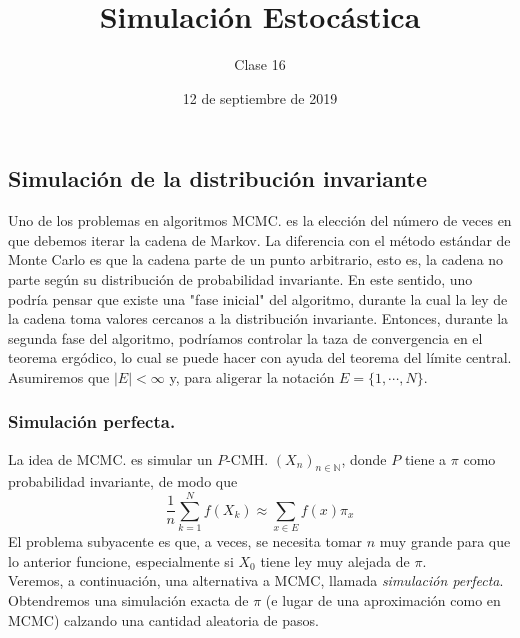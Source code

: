 \documentclass[a4paper]{article}
\title{Simulación Estocástica}
\author{Clase 16}
\date{12 de septiembre de 2019}
\numberwithin{equation}{subsection}
\numberwithin{definicion}{subsection}
\def\N{\mathbb N}
\begin{document}
\maketitle

\subsection{Simulación de la distribución invariante}
Uno de los problemas en algoritmos MCMC. es la elección del número de veces en que debemos iterar la cadena de Markov. La diferencia con el método estándar de Monte Carlo es que la cadena parte de un punto arbitrario, esto es, la cadena no parte según su distribución de probabilidad invariante. En este sentido, uno podría pensar que existe una "fase inicial" del algoritmo, durante la cual la ley de la cadena toma valores cercanos a la distribución invariante. Entonces, durante la segunda fase del algoritmo, podríamos controlar la taza de convergencia en el teorema ergódico, lo cual se puede hacer con ayuda del teorema del límite central. \\ Asumiremos que $|E| < \infty$ y, para aligerar la notación $E=\{1,\cdots,N\}$.

\subsubsection{Simulación perfecta.}
La idea de MCMC. es simular  un $P$-CMH. $(X_n)_{n\in\N}$, donde  $P$ tiene a $\pi$ como probabilidad invariante, de modo que
\[\frac{1}{n}\sum_{k=1}^Nf(X_k) \approx \sum_{x\in E}f(x)\pi_x\]
El problema subyacente es que, a veces, se necesita tomar $n$ muy grande  para que lo anterior funcione, especialmente si $X_0$ tiene ley muy alejada de $\pi$.\\ \newline
Veremos, a continuación, una alternativa a MCMC, llamada \textit{simulación perfecta}. Obtendremos una simulación exacta de $\pi$ (e lugar de una aproximación como en MCMC) calzando una cantidad aleatoria de pasos.\\ \newline
\end{document}
